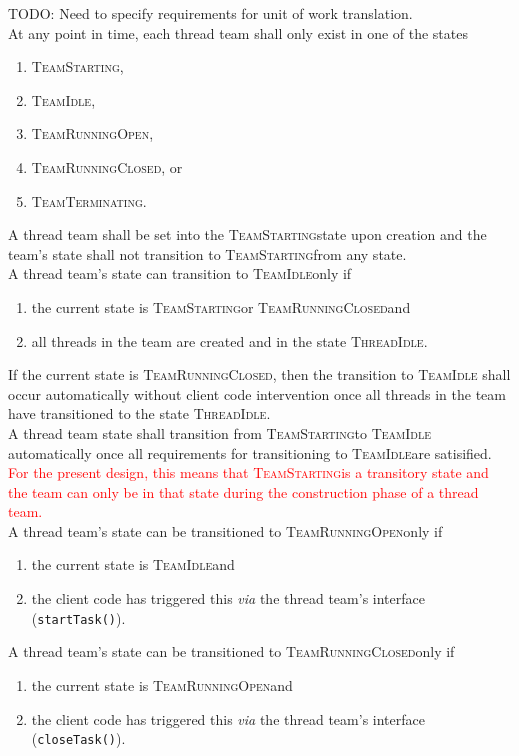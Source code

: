 \documentclass{article}
\newcommand{\TeamStarting}      {\textsc{TeamStarting}}
\newcommand{\TeamIdle}          {\textsc{TeamIdle}}
\newcommand{\TeamRunningOpen}   {\textsc{TeamRunningOpen}}
\newcommand{\TeamRunningClosed} {\textsc{TeamRunningClosed}}
\newcommand{\TeamTerminating}   {\textsc{TeamTerminating}}
\newcommand{\ThreadIdle}        {\textsc{ThreadIdle}}
\begin{document}
TODO: Need to specify requirements for unit of work translation.\\

At any point in time, each thread team shall only exist in one of the states
\begin{enumerate}
\item{\TeamStarting,}
\item{\TeamIdle,}
\item{\TeamRunningOpen,}
\item{\TeamRunningClosed, or}
\item{\TeamTerminating.}
\end{enumerate}

A thread team shall be set into the \TeamStarting state upon creation and the
team's state shall not transition to \TeamStarting from any state. \\

A thread team's state can transition to \TeamIdle only if
\begin{enumerate}
\item{the current state is \TeamStarting or \TeamRunningClosed and}
\item{all threads in the team are created and in the state \ThreadIdle.}
\end{enumerate}
If the current state is \TeamRunningClosed, then the transition to \TeamIdle
shall occur automatically without client code intervention once all threads in
the team have transitioned to the state \ThreadIdle.\\

A thread team state shall transition from \TeamStarting to \TeamIdle
automatically once all requirements for transitioning to \TeamIdle are
satisified.  \textcolor{red}{For the present design, this means that
\TeamStarting is a transitory state and the team can only be in that state
during the construction phase of a thread team.}\\

A thread team's state can be transitioned to \TeamRunningOpen only if
\begin{enumerate}
\item{the current state is \TeamIdle and}
\item{the client code has triggered this \textit{via} the thread team's
interface (\texttt{startTask()}).}
\end{enumerate}

A thread team's state can be transitioned to \TeamRunningClosed only if
\begin{enumerate}
\item{the current state is \TeamRunningOpen and}
\item{the client code has triggered this \textit{via} the thread team's
interface (\texttt{closeTask()}).}
\end{enumerate}
\end{document}
